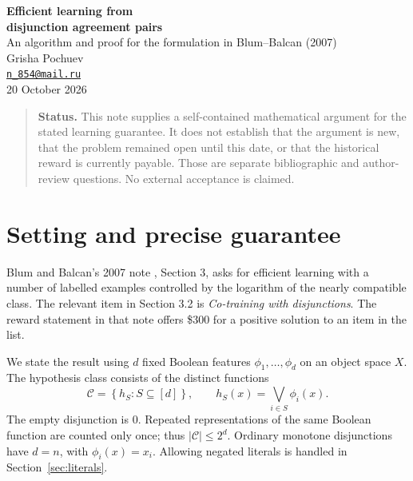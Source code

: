 \documentclass[11pt,a4paper]{article}
\newcommand{\C}{\mathcal C}
\begin{document}
\begin{center}
{\LARGE\bfseries\color{ink}Efficient learning from\\[3pt]
disjunction agreement pairs}\\[9pt]
{\large An algorithm and proof for the formulation in Blum--Balcan (2007)}\\[10pt]
Grisha Pochuev\\
\href{mailto:n_854@mail.ru}{\texttt{n\_854@mail.ru}}\\
20 October 2026
\end{center}

\begin{abstract}
An elementary exclusion-closure algorithm computes the greatest disjunction
consistent with labelled examples and exact agreement on unlabelled pairs.
Combining this solver with two finite-class bounds gives a polynomial-time
learner using
\(O((\ln|\C_{D,\chi}(\tau)|+\ln(1/\delta))/\varepsilon)\)
labelled pairs and
\(O((n+\ln(1/\delta))/\tau)\) unlabelled pairs, for arbitrary joint
distributions satisfying the realizable agreement promise. Taking
\(\tau=\varepsilon\) gives the labelled-sample benchmark in the stated
2007 question. A fully specified stopping rule removes the need to know
or count the compatible class, with the same order of labels in expectation
and with high probability.
\end{abstract}

\begin{quote}
\small\textbf{Status.} This note supplies a self-contained mathematical argument
for the stated learning guarantee. It does not establish that the argument is
new, that the problem remained open until this date, or that the historical
reward is currently payable. Those are separate bibliographic and author-review
questions. No external acceptance is claimed.
\end{quote}

\section{Setting and precise guarantee}

Blum and Balcan's 2007 note \cite{bb07}, Section 3, asks for efficient
learning with a number of labelled examples controlled by the logarithm
of the nearly compatible class. The relevant item in Section 3.2 is
\emph{Co-training with disjunctions}. The reward statement in that note
offers \$300 for a positive solution to an item in the list.

We state the result using \(d\) fixed Boolean features
\(\phi_1,\ldots,\phi_d\) on an object space \(X\). The hypothesis class consists
of the distinct functions
\[
 \C=\left\{h_S:S\subseteq[d]\right\},\qquad
 h_S(x)=\bigvee_{i\in S}\phi_i(x).
\]
The empty disjunction is \(0\). Repeated representations of the same Boolean
function are counted only once; thus \(|\C|\le 2^d\). Ordinary monotone
disjunctions have \(d=n\), with \(\phi_i(x)=x_i\).
Allowing negated literals is handled in Section~\ref{sec:literals}.
\end{document}
